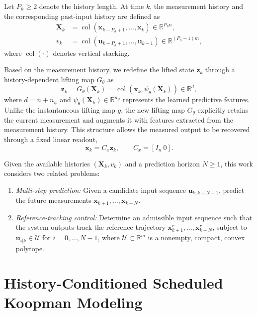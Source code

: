 \documentclass[journal]{IEEEtran}
\newcommand{\vx}{\mathbf{x}}
\newcommand{\vu}{\mathbf{u}}
\newcommand{\vz}{\mathbf{z}}
\newcommand{\mX}{\mathbf{X}}
\newcommand{\R}{\mathbb{R}}
\newcommand{\col}{\operatorname{col}}
\theoremstyle{plain}
\theoremstyle{definition}
\theoremstyle{definition}
\begin{document}
Let $P_h\geq2$ denote the history length. At time $k$, the
measurement history and the corresponding past-input history
are defined as
\begin{align}
\mX_k&=\col(\vx_{k-P_h+1},\ldots,\vx_k)\in\R^{P_hn},
\label{eq:measurement_window}\\
v_k&=\col(\vu_{k-P_h+1},\ldots,\vu_{k-1})
\in\R^{(P_h-1)m},
\label{eq:past_input_history}
\end{align}
where $\col(\cdot)$ denotes vertical stacking.

Based on the measurement history, we redefine the lifted state
$\vz_k$ through a history-dependent lifting map $G_\theta$ as
\begin{equation}
\vz_k=G_\theta(\mX_k)
=\col(\vx_k,\psi_\theta(\mX_k))\in\R^d,
\label{eq:state_preserving_lifting}
\end{equation}
where $d=n+n_\psi$ and $\psi_\theta(\mX_k)\in\R^{n_\psi}$
represents the learned predictive features.
Unlike the instantaneous lifting map $g$, the new lifting map
$G_\theta$ explicitly retains the current measurement and
augments it with features extracted from the measurement history.
This structure allows the measured output to be recovered through
a fixed linear readout,
\begin{equation}
\vx_k=C_x\vz_k,\qquad C_x=[I_n\ 0].
\label{eq:state_readout}
\end{equation}

Given the available histories $(\mX_k,v_k)$ and a prediction
horizon $N\geq1$, this work considers two related problems:
\begin{enumerate}
    \item \emph{Multi-step prediction:}
    Given a candidate input sequence $\vu_{k:k+N-1}$,
    predict the future measurements
    $\vx_{k+1},\ldots,\vx_{k+N}$.

    \item \emph{Reference-tracking control:}
    Determine an admissible input sequence such that the system
    outputs track the reference trajectory
    $\vx_{k+1}^r,\ldots,\vx_{k+N}^r$,
    subject to $\vu_{i|k}\in\mathcal U$ for $i=0,\ldots,N-1$,
    where $\mathcal U\subset\R^m$ is a nonempty, compact,
    convex polytope.
\end{enumerate}

\section{History-Conditioned Scheduled Koopman Modeling}
\label{sec:model}
\end{document}
